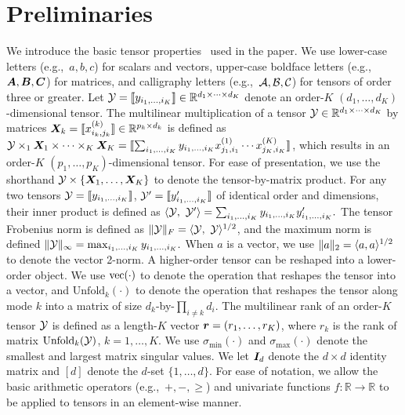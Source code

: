 \documentclass[12pt]{article}
\theoremstyle{definition}
\theoremstyle{definition}
\begin{document}
\section{Preliminaries}\label{sec:pre}
We introduce the basic tensor properties~\citep{kolda2009tensor} used in the paper. We use lower-case letters (e.g.,\ $a,b,c$) for scalars and vectors, upper-case boldface letters (e.g.,\ $\bm A, \bm B, \bm C$) for matrices, and calligraphy letters (e.g.,\ $\mathcal{A}, \mathcal{B}, \mathcal{C}$) for tensors of order three or greater. Let $\mathcal{Y}=\llbracket y_{i_1,\ldots,i_K} \rrbracket\in \mathbb{R}^{d_1\times \cdots\times d_K}$ denote an order-$K$ $(d_1,\ldots,d_K)$-dimensional tensor. The multilinear multiplication of a tensor $\mathcal{Y}\in\mathbb{R}^{d_1\times \cdots\times d_K}$ by matrices $\bm X_k=\llbracket x_{i_k,j_k}^{(k)} \rrbracket\in\mathbb{R}^{p_k\times d_k}$ is defined as $\mathcal{Y} \times_1\bm X_1\times \cdots \times_K \bm X_K=\llbracket \sum_{i_1,\ldots,i_K}y_{i_1,\ldots,i_K}x_{j_1,i_1}^{(1)}\cdots x_{j_K,i_K}^{(K)} \rrbracket$,
which results in an order-$K$ $(p_1,\ldots,p_K)$-dimensional tensor. For ease of presentation, we use the shorthand $\mathcal{Y}\times\{\bm X_1,\ldots,\bm X_K\}$ to denote the tensor-by-matrix product. For any two tensors $\mathcal{Y}=\llbracket y_{i_1,\ldots,i_K} \rrbracket$, $\mathcal{Y}'=\llbracket y'_{i_1,\ldots,i_K} \rrbracket$ of identical order and dimensions, their inner product is defined as $\langle \mathcal{Y},\ \mathcal{Y}'\rangle =\sum_{i_1,\ldots,i_K}y_{i_1,\ldots,i_K}y'_{i_1,\ldots,i_K}.$
The tensor Frobenius norm is defined as $\lVert\mathcal{Y}\rVert_F=\langle \mathcal{Y},\ \mathcal{Y} \rangle^{1/2}$, and the maximum norm is defined $\lVert\mathcal{Y}\rVert_\infty=\max_{i_1,\ldots,i_K}y_{i_1,\ldots,i_K}.$
When $a$ is a vector, we use $\lVert a\rVert_2=\langle a,a \rangle^{1/2}$ to denote the vector 2-norm. A higher-order tensor can be reshaped into a lower-order object. We use $\textup{vec}(\cdot)$ to denote the operation that reshapes the tensor into a vector, and $\text{Unfold}_k(\cdot)$ to denote the operation that reshapes the tensor along mode $k$ into a matrix of size $d_k$-by-$\prod_{i\neq k}d_i$. The multilinear rank of an order-$K$ tensor $\mathcal{Y}$ is defined as a length-$K$ vector $\bm{r}=(r_1,\ldots,r_K)$, where $r_k$ is the rank of matrix $\textup{Unfold}_k(\mathcal{Y})$, $k=1,\ldots,K$. We use $\sigma_{\min}(\cdot)$ and $\sigma_{\max}(\cdot)$ denote the smallest and largest matrix singular values. We let $\bm I_d$ denote the $d \times d$ identity matrix and $[d]$ denote the $d$-set $\{1,\ldots,d\}$. For ease of notation, we allow the basic arithmetic operators (e.g.,\ $+, -, \geq $) and univariate functions $f\colon \mathbb{R}\to \mathbb{R}$ to be applied to tensors in an element-wise manner. 
\end{document}
